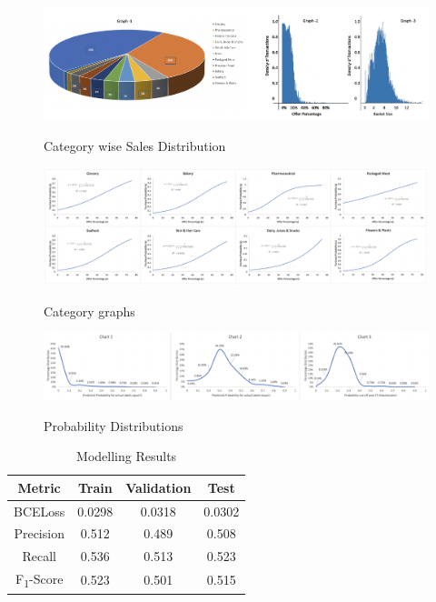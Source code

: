   \begin{figure}[t]
    \centering 
    \caption{Category wise Sales Distribution} 
    \includegraphics[width=5.5in]{img/sales_dist.png} 
    \label{fig:sales_dist} 
  \end{figure}

  \begin{figure}[t]
    \centering 
    \caption{Category graphs} 
    \includegraphics[width=5.5in]{img/cat_curves.png} 
    \label{fig:cat_curves} 
  \end{figure}

 \begin{figure}[t]
    \centering 
    \caption{Probability Distributions} 
    \includegraphics[width=5.5in]{img/prob_dist.png} 
    \label{fig:prob_dist} 
  \end{figure}
  
\begin{table}[t]
\caption{Modelling Results}
\vspace{0.3 in}
\centering
\resizebox{2.2in}{!}
{%
\begin{tabular}{|c|c|c|c|}
\hline
{\bf Metric} & {\bf Train} & {\bf Validation} & {\bf Test} \\  
\hline\hline
BCELoss  		&  0.0298 &  0.0318 &  0.0302 \\ \hline
Precision	  		&  0.512 &  0.489 &  0.508 \\ \hline
Recall	  		&  0.536 & 0.513&  0.523\\ \hline
F\textsubscript{1}-Score	&  0.523 & 0.501 &  0.515\\
\hline
\end{tabular}
}
\label{tab:datasplit}
\end{table}